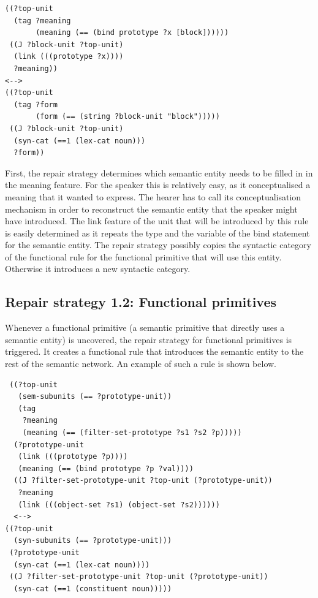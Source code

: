 \footnotesize
{}
\begin{lstlisting}
((?top-unit
  (tag ?meaning 
       (meaning (== (bind prototype ?x [block])))))
 ((J ?block-unit ?top-unit)
  (link (((prototype ?x))))
  ?meaning))
<-->
((?top-unit
  (tag ?form 
       (form (== (string ?block-unit "block")))))
 ((J ?block-unit ?top-unit) 
  (syn-cat (==1 (lex-cat noun)))
  ?form))
\end{lstlisting}
\normalsize

First, the repair strategy determines which semantic entity needs to
be filled in in the meaning feature. For the speaker this is
relatively easy, as it conceptualised a meaning that it wanted to
express. The hearer has to call its conceptualisation mechanism in
order to reconstruct the semantic entity that the speaker might have
introduced. The link feature of the unit that will be introduced by
this rule is easily determined as it repeats the type and the variable
of the bind statement for the semantic entity. The repair strategy
possibly copies the syntactic category of the functional rule for the
functional primitive that will use this entity. Otherwise it
introduces a new syntactic category.

\subsection{Repair strategy 1.2: Functional primitives}

Whenever a functional primitive (a semantic primitive that directly
uses a semantic entity) is uncovered, the repair strategy for
functional primitives is triggered. It creates a functional rule that
introduces the semantic entity to the rest of the semantic network. An
example of such a rule is shown below.

\footnotesize
{}
\begin{lstlisting}
 ((?top-unit
   (sem-subunits (== ?prototype-unit))
   (tag
    ?meaning
    (meaning (== (filter-set-prototype ?s1 ?s2 ?p)))))
  (?prototype-unit
   (link (((prototype ?p))))
   (meaning (== (bind prototype ?p ?val))))
  ((J ?filter-set-prototype-unit ?top-unit (?prototype-unit))
   ?meaning
   (link (((object-set ?s1) (object-set ?s2))))))
  <-->
((?top-unit 
  (syn-subunits (== ?prototype-unit)))
 (?prototype-unit 
  (syn-cat (==1 (lex-cat noun))))
 ((J ?filter-set-prototype-unit ?top-unit (?prototype-unit))
  (syn-cat (==1 (constituent noun)))))
\end{lstlisting}
\normalsize

